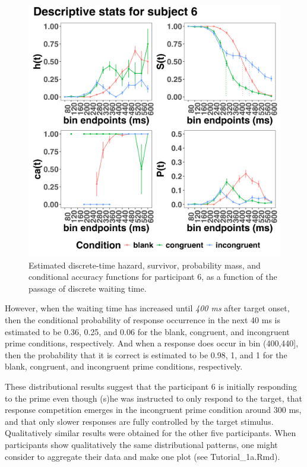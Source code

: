 \documentclass[
  man, donotrepeattitle,floatsintext]{apa6}
\begin{document}
\begin{figure}[H]

{\centering \includegraphics[width=21.33in,height=0.67\textheight,]{../Tutorial_1_descriptive_stats/figures/Plot_for_subject6_PanisSchmidt} 

}

\caption{Estimated discrete-time hazard, survivor, probability mass, and conditional accuracy functions for participant 6, as a function of the passage of discrete waiting time.}\label{fig:eha-plot}
\end{figure}

However, when the waiting time has increased until \emph{400 ms} after target onset, then the conditional probability of response occurrence in the next 40 ms is estimated to be 0.36, 0.25, and 0.06 for the blank, congruent, and incongruent prime conditions, respectively. And when a response does occur in bin (400,440{]}, then the probability that it is correct is estimated to be 0.98, 1, and 1 for the blank, congruent, and incongruent prime conditions, respectively.

These distributional results suggest that the participant 6 is initially responding to the prime even though (s)he was instructed to only respond to the target, that response competition emerges in the incongruent prime condition around 300 ms, and that only slower responses are fully controlled by the target stimulus. Qualitatively similar results were obtained for the other five participants. When participants show qualitatively the same distributional patterns, one might consider to aggregate their data and make one plot (see Tutorial\_1a.Rmd).
\end{document}
